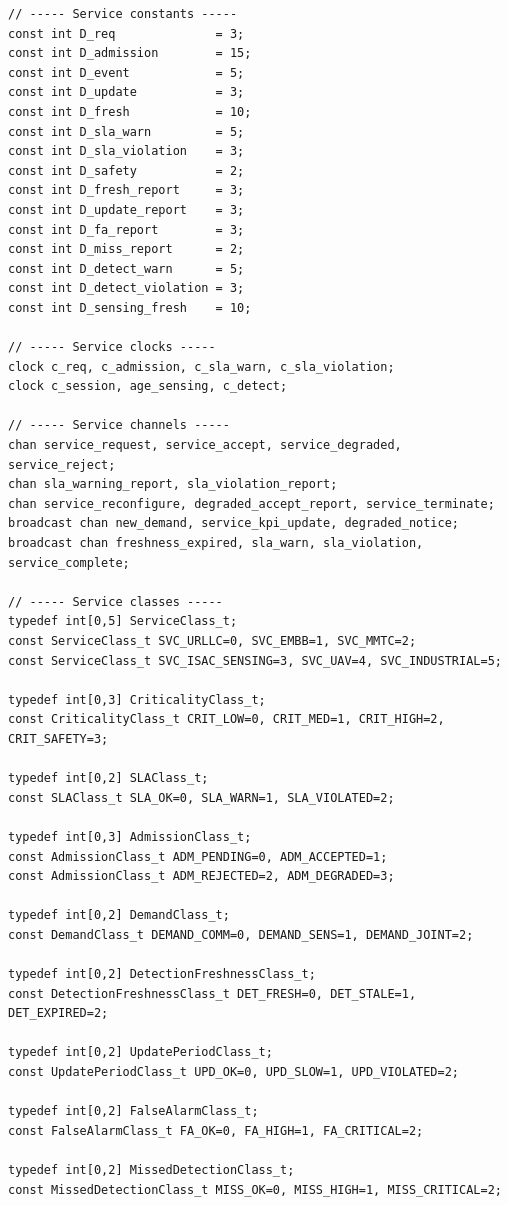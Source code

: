 \documentclass[10pt,a4paper]{article}
\begin{document}
\begin{verbatim}
// ----- Service constants -----
const int D_req              = 3;
const int D_admission        = 15;
const int D_event            = 5;
const int D_update           = 3;
const int D_fresh            = 10;
const int D_sla_warn         = 5;
const int D_sla_violation    = 3;
const int D_safety           = 2;
const int D_fresh_report     = 3;
const int D_update_report    = 3;
const int D_fa_report        = 3;
const int D_miss_report      = 2;
const int D_detect_warn      = 5;
const int D_detect_violation = 3;
const int D_sensing_fresh    = 10;

// ----- Service clocks -----
clock c_req, c_admission, c_sla_warn, c_sla_violation;
clock c_session, age_sensing, c_detect;

// ----- Service channels -----
chan service_request, service_accept, service_degraded, service_reject;
chan sla_warning_report, sla_violation_report;
chan service_reconfigure, degraded_accept_report, service_terminate;
broadcast chan new_demand, service_kpi_update, degraded_notice;
broadcast chan freshness_expired, sla_warn, sla_violation, service_complete;

// ----- Service classes -----
typedef int[0,5] ServiceClass_t;
const ServiceClass_t SVC_URLLC=0, SVC_EMBB=1, SVC_MMTC=2;
const ServiceClass_t SVC_ISAC_SENSING=3, SVC_UAV=4, SVC_INDUSTRIAL=5;

typedef int[0,3] CriticalityClass_t;
const CriticalityClass_t CRIT_LOW=0, CRIT_MED=1, CRIT_HIGH=2, CRIT_SAFETY=3;

typedef int[0,2] SLAClass_t;
const SLAClass_t SLA_OK=0, SLA_WARN=1, SLA_VIOLATED=2;

typedef int[0,3] AdmissionClass_t;
const AdmissionClass_t ADM_PENDING=0, ADM_ACCEPTED=1;
const AdmissionClass_t ADM_REJECTED=2, ADM_DEGRADED=3;

typedef int[0,2] DemandClass_t;
const DemandClass_t DEMAND_COMM=0, DEMAND_SENS=1, DEMAND_JOINT=2;

typedef int[0,2] DetectionFreshnessClass_t;
const DetectionFreshnessClass_t DET_FRESH=0, DET_STALE=1, DET_EXPIRED=2;

typedef int[0,2] UpdatePeriodClass_t;
const UpdatePeriodClass_t UPD_OK=0, UPD_SLOW=1, UPD_VIOLATED=2;

typedef int[0,2] FalseAlarmClass_t;
const FalseAlarmClass_t FA_OK=0, FA_HIGH=1, FA_CRITICAL=2;

typedef int[0,2] MissedDetectionClass_t;
const MissedDetectionClass_t MISS_OK=0, MISS_HIGH=1, MISS_CRITICAL=2;


\end{verbatim}
\end{document}
